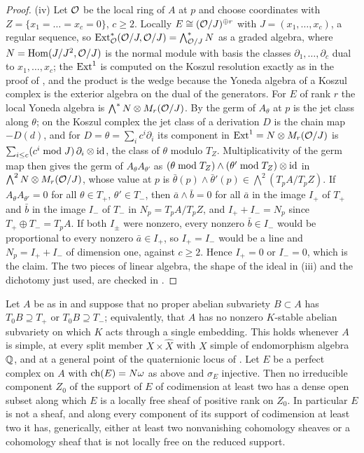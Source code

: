 \begin{proof}
(iv) Let $\mathcal{O}$ be the local ring of $A$ at $p$ and choose coordinates with
$Z=\{x_{1}=\dots=x_{c}=0\}$, $c\ge2$. Locally $E\cong(\mathcal{O}/J)^{\oplus r}$
with $J=(x_{1},\dots,x_{c})$, a regular sequence, so
$\operatorname{Ext}^{*}_{\mathcal{O}}(\mathcal{O}/J,\mathcal{O}/J)=\bigwedge^{*}_{\mathcal{O}/J}N$ as a graded algebra,
where $N=\operatorname{Hom}(J/J^{2},\mathcal{O}/J)$ is the normal module with basis the classes
$\partial_{1},\dots,\partial_{c}$ dual to $x_{1},\dots,x_{c}$; the
$\operatorname{Ext}^{1}$ is computed on the Koszul resolution exactly as in the proof of
, and the product is the wedge because the Yoneda
algebra of a Koszul complex is the exterior algebra on the dual of the
generators. For $E$ of rank $r$ the local Yoneda algebra is
$\bigwedge^{*}N\otimes M_{r}(\mathcal{O}/J)$. By  the germ of
$A_{\theta}$ at $p$ is the jet class along $\theta$; on the Koszul complex the
jet class of a derivation $D$ is the chain map $-D(d)$, and for
$D=\theta=\sum_{i}c^{i}\partial_{i}$ its component in $\operatorname{Ext}^{1}=N\otimes M_{r}(\mathcal{O}/J)$
is $\sum_{i\le c}(c^{i}\bmod J)\,\partial_{i}\otimes\operatorname{id}$, the class of
$\theta$ modulo $T_{Z}$. Multiplicativity of the germ map then gives the germ
of $A_{\theta}A_{\theta'}$ as
$(\theta\bmod T_{Z})\wedge(\theta'\bmod T_{Z})\otimes\operatorname{id}$ in
$\bigwedge^{2}N\otimes M_{r}(\mathcal{O}/J)$, whose value at $p$ is
$\bar\theta(p)\wedge\bar\theta'(p)\in\bigwedge^{2}(T_{p}A/T_{p}Z)$. If
$A_{\theta}A_{\theta'}=0$ for all $\theta\in T_{+}$, $\theta'\in T_{-}$,
then $\bar a\wedge\bar b=0$ for all $\bar a$ in the image $I_{+}$ of $T_{+}$
and $\bar b$ in the image $I_{-}$ of $T_{-}$ in $N_{p}=T_{p}A/T_{p}Z$, and
$I_{+}+I_{-}=N_{p}$ since $T_{+}\oplus T_{-}=T_{p}A$. If both $I_{\pm}$ were
nonzero, every nonzero $\bar b\in I_{-}$ would be proportional to every
nonzero $\bar a\in I_{+}$, so $I_{+}=I_{-}$ would be a line and
$N_{p}=I_{+}+I_{-}$ of dimension one, against $c\ge2$. Hence $I_{+}=0$ or
$I_{-}=0$, which is the claim. The two pieces of linear algebra, the shape of
the ideal in (iii) and the dichotomy just used, are checked in \cite{BMB26}.
\end{proof}

\begin{corollary}\label{cor:p2shape}
Let $A$ be as in  and suppose that no proper abelian
subvariety $B\subset A$ has $T_{0}B\supseteq T_{+}$ or $T_{0}B\supseteq T_{-}$;
equivalently, that $A$ has no nonzero $K$-stable abelian subvariety on which
$K$ acts through a single embedding. This holds whenever $A$ is simple, at
every split member $X\times\widehat X$ with $X$ simple of endomorphism
algebra $\mathbb{Q}$, and at a general point of the quaternionic locus of
.
Let $E$ be a perfect complex on $A$ with $\operatorname{ch}(E)=N\omega$ as above and
$\sigma_{E}$ injective. Then no irreducible component $Z_{0}$ of the support
of $E$ of codimension at least two has a dense open subset along which $E$ is
a locally free sheaf of positive rank on $Z_{0}$. In particular $E$ is not a
sheaf, and along every component of its support of codimension at least two
it has, generically, either at least two nonvanishing cohomology sheaves or a
cohomology sheaf that is not locally free on the reduced support.
\end{corollary}

